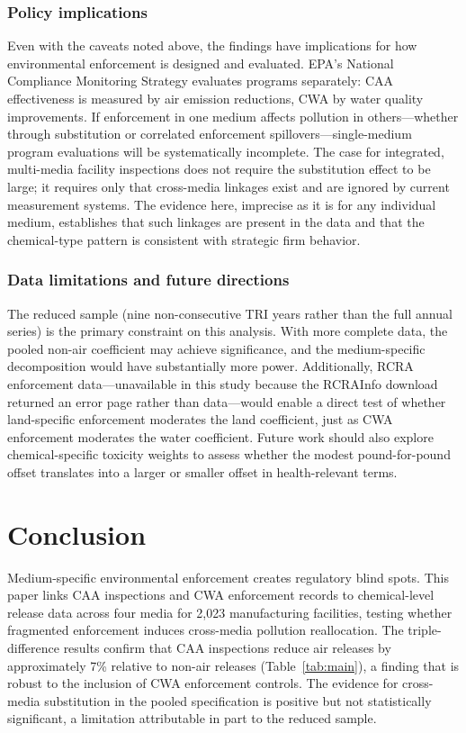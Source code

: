 \documentclass[12pt]{article}
\begin{document}
\subsubsection*{Policy implications} Even with the caveats noted above, the findings have implications for how environmental enforcement is designed and evaluated. EPA's National Compliance Monitoring Strategy evaluates programs separately: CAA effectiveness is measured by air emission reductions, CWA by water quality improvements. If enforcement in one medium affects pollution in others---whether through substitution or correlated enforcement spillovers---single-medium program evaluations will be systematically incomplete. The case for integrated, multi-media facility inspections \citep{sigman2001crossmedia} does not require the substitution effect to be large; it requires only that cross-media linkages exist and are ignored by current measurement systems. The evidence here, imprecise as it is for any individual medium, establishes that such linkages are present in the data and that the chemical-type pattern is consistent with strategic firm behavior.

\subsubsection*{Data limitations and future directions} The reduced sample (nine non-consecutive TRI years rather than the full annual series) is the primary constraint on this analysis. With more complete data, the pooled non-air coefficient may achieve significance, and the medium-specific decomposition would have substantially more power. Additionally, RCRA enforcement data---unavailable in this study because the RCRAInfo download returned an error page rather than data---would enable a direct test of whether land-specific enforcement moderates the land coefficient, just as CWA enforcement moderates the water coefficient. Future work should also explore chemical-specific toxicity weights to assess whether the modest pound-for-pound offset translates into a larger or smaller offset in health-relevant terms.


\section{Conclusion}
\label{sec:conclusion}

Medium-specific environmental enforcement creates regulatory blind spots. This paper links CAA inspections and CWA enforcement records to chemical-level release data across four media for 2,023 manufacturing facilities, testing whether fragmented enforcement induces cross-media pollution reallocation. The triple-difference results confirm that CAA inspections reduce air releases by approximately 7\% relative to non-air releases (Table~\ref{tab:main}), a finding that is robust to the inclusion of CWA enforcement controls. The evidence for cross-media substitution in the pooled specification is positive but not statistically significant, a limitation attributable in part to the reduced sample.
\end{document}
